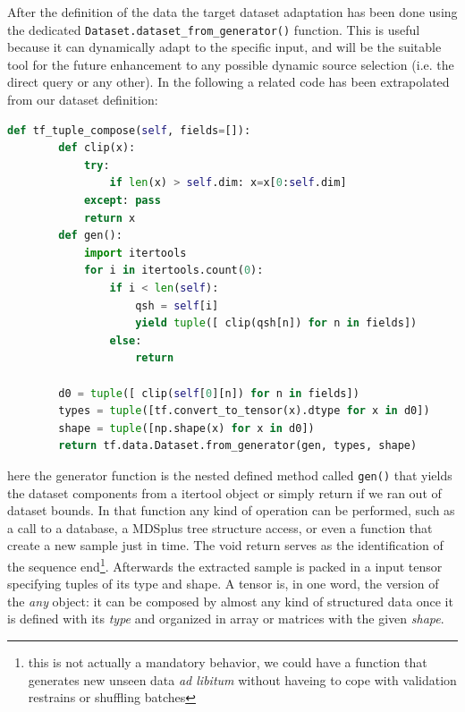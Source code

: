 After the definition of the data the target \TF dataset adaptation has been done using the dedicated \TF \verb|Dataset.dataset_from_generator()| function. This is useful because it can dynamically adapt to the specific input, and will be the suitable tool for the future enhancement to any possible dynamic source selection (i.e. the direct \MDSplus query or any other).
In the following a related code has been extrapolated from our dataset definition:
%
\begin{lstlisting}[language=Python, caption=Dataset from generator]
    def tf_tuple_compose(self, fields=[]):
        def clip(x):
            try: 
                if len(x) > self.dim: x=x[0:self.dim]
            except: pass
            return x
        def gen():
            import itertools
            for i in itertools.count(0):
                if i < len(self):
                    qsh = self[i]
                    yield tuple([ clip(qsh[n]) for n in fields])
                else:
                    return

        d0 = tuple([ clip(self[0][n]) for n in fields])
        types = tuple([tf.convert_to_tensor(x).dtype for x in d0])
        shape = tuple([np.shape(x) for x in d0])
        return tf.data.Dataset.from_generator(gen, types, shape)
\end{lstlisting}
%
here the generator function is the nested defined method called \verb|gen()| that yields the dataset components from a itertool object or simply return if we ran out of dataset bounds. In that function any kind of operation can be performed, such as a call to a database, a MDSplus tree structure access, or even a function that create a new sample just in time. The void return serves as the identification of the sequence end\footnote{this is not actually a mandatory behavior, we could have a function that generates new unseen data \textit{ad libitum} without haveing to cope with validation restrains or shuffling batches}.
Afterwards the extracted sample is packed in a \TF input tensor specifying tuples of its type and shape. A tensor is, in one word, the \TF version of the \textit{any} object: it can be composed by almost any kind of structured data once it is defined with its \textit{type} and organized in array or matrices with the given \textit{shape}.

